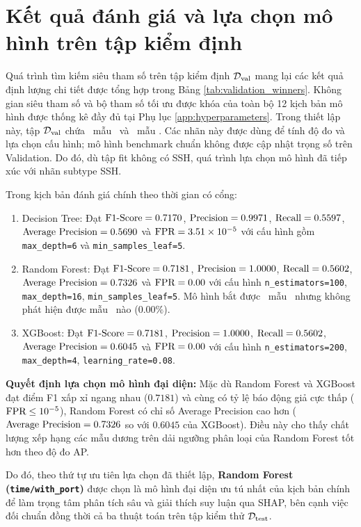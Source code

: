 
\section{Kết quả đánh giá và lựa chọn mô hình trên tập kiểm định}

Quá trình tìm kiếm siêu tham số trên tập kiểm định $\mathcal{D}_{\text{val}}$ mang lại các kết quả định lượng chi tiết được tổng hợp trong Bảng \ref{tab:validation_winners}. Không gian siêu tham số và bộ tham số tối ưu được khóa của toàn bộ 12 kịch bản mô hình được thống kê đầy đủ tại Phụ lục \ref{app:hyperparameters}. Trong thiết lập này, tập $\mathcal{D}_{\text{val}}$ chứa \DataValidationFTP\ mẫu \FTP\ và \DataValidationSSH\ mẫu \SSH. Các nhãn này được dùng để tính độ đo và lựa chọn cấu hình; mô hình benchmark chuẩn không được cập nhật trọng số trên Validation. Do đó, dù tập fit không có SSH, quá trình lựa chọn mô hình đã tiếp xúc với nhãn subtype SSH.



Trong kịch bản đánh giá chính theo thời gian có cổng:
\begin{enumerate}
    \item Decision Tree:
    Đạt $\text{F1-Score} = 0.7170$, $\text{Precision} = 0.9971$, $\text{Recall} = 0.5597$, $\text{Average Precision} = 0.5690$ và $\text{FPR} = 3.51\times 10^{-5}$ với cấu hình gồm \texttt{max\_depth=6} và \texttt{min\_samples\_leaf=5}.
    \item Random Forest:
    Đạt $\text{F1-Score} = 0.7181$, $\text{Precision} = 1.0000$, $\text{Recall} = 0.5602$, $\text{Average Precision} = 0.7326$ và $\text{FPR} = 0.00$ với cấu hình \texttt{n\_estimators=100}, \texttt{max\_depth=16}, \texttt{min\_samples\_leaf=5}. Mô hình bắt được \WinnerValFTPRecall\ mẫu \FTP\ nhưng không phát hiện được mẫu \SSH\ nào ($0.00\%$).
    \item XGBoost:
    Đạt $\text{F1-Score} = 0.7181$, $\text{Precision} = 1.0000$, $\text{Recall} = 0.5602$, $\text{Average Precision} = 0.6045$ và $\text{FPR} = 0.00$ với cấu hình \texttt{n\_estimators=200}, \texttt{max\_depth=4}, \texttt{learning\_rate=0.08}.
\end{enumerate}

\noindent\textbf{Quyết định lựa chọn mô hình đại diện:}
Mặc dù Random Forest và XGBoost đạt điểm F1 xấp xỉ ngang nhau ($0.7181$) và cùng có tỷ lệ báo động giả cực thấp ($\text{FPR} \le 10^{-5}$), Random Forest có chỉ số Average Precision cao hơn ($\text{Average Precision} = 0.7326$ so với $0.6045$ của XGBoost). Điều này cho thấy chất lượng xếp hạng các mẫu dương trên dải ngưỡng phân loại của Random Forest tốt hơn theo độ đo AP.

Do đó, theo thứ tự ưu tiên lựa chọn đã thiết lập, \textbf{Random Forest (\texttt{time/with\_port})} được chọn là mô hình đại diện ưu tú nhất của kịch bản chính để làm trọng tâm phân tích sâu và giải thích suy luận qua SHAP, bên cạnh việc đối chuẩn đồng thời cả ba thuật toán trên tập kiểm thử $\mathcal{D}_{\text{test}}$.
